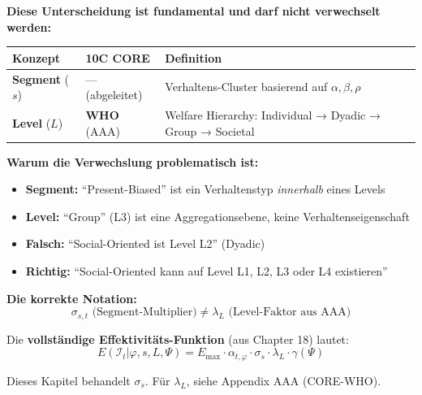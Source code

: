 \begin{tcolorbox}[colback=red!5!white, colframe=red!75!black,
    title=\textbf{KRITISCHE KLARSTELLUNG: Segment $\neq$ Level (10C WHO)}]

\textbf{Diese Unterscheidung ist fundamental und darf nicht verwechselt werden:}

\begin{center}
\renewcommand{\arraystretch}{1.4}
\begin{tabular}{@{}lll@{}}
\toprule
\textbf{Konzept} & \textbf{10C CORE} & \textbf{Definition} \\
\midrule
\textbf{Segment} ($s$) & --- (abgeleitet) & Verhaltens-Cluster basierend auf $\alpha, \beta, \rho$ \\
\textbf{Level} ($L$) & \textbf{WHO} (AAA) & Welfare Hierarchy: Individual → Dyadic → Group → Societal \\
\bottomrule
\end{tabular}
\end{center}

\textbf{Warum die Verwechslung problematisch ist:}
\begin{itemize}[nosep]
\item \textbf{Segment:} ``Present-Biased'' ist ein Verhaltenstyp \textit{innerhalb} eines Levels
\item \textbf{Level:} ``Group'' (L3) ist eine Aggregationsebene, keine Verhaltenseigenschaft
\item \textbf{Falsch:} ``Social-Oriented ist Level L2'' (Dyadic)
\item \textbf{Richtig:} ``Social-Oriented kann auf Level L1, L2, L3 oder L4 existieren''
\end{itemize}

\textbf{Die korrekte Notation:}
\begin{equation}
\sigma_{s,t} \text{ (Segment-Multiplier)} \neq \lambda_{L} \text{ (Level-Faktor aus AAA)}
\end{equation}

Die \textbf{vollständige Effektivitäts-Funktion} (aus Chapter 18) lautet:
\begin{equation}
\boxed{E(\mathcal{I}_t | \varphi, s, L, \Psi) = E_{\max} \cdot \alpha_{t,\varphi} \cdot \sigma_s \cdot \lambda_L \cdot \gamma(\Psi)}
\end{equation}

Dieses Kapitel behandelt $\sigma_s$. Für $\lambda_L$, siehe Appendix AAA (CORE-WHO).
\end{tcolorbox}

